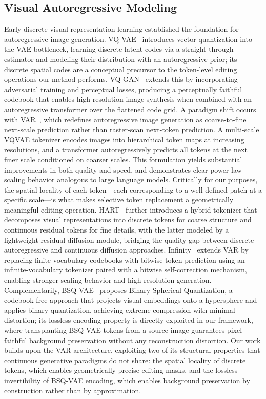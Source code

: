 \subsection{Visual Autoregressive Modeling}
Early discrete visual representation learning established the foundation for autoregressive image generation. VQ-VAE~\cite{VQVAE} introduces vector quantization into the VAE bottleneck, learning discrete latent codes via a straight-through estimator and modeling their distribution with an autoregressive prior; its discrete spatial codes are a conceptual precursor to the token-level editing operations our method performs. VQ-GAN~\cite{VQGAN} extends this by incorporating adversarial training and perceptual losses, producing a perceptually faithful codebook that enables high-resolution image synthesis when combined with an autoregressive transformer over the flattened code grid.
A paradigm shift occurs with VAR~\cite{VAR}, which redefines autoregressive image generation as coarse-to-fine next-scale prediction rather than raster-scan next-token prediction. A multi-scale VQVAE tokenizer encodes images into hierarchical token maps at increasing resolutions, and a transformer autoregressively predicts all tokens at the next finer scale conditioned on coarser scales. This formulation yields substantial improvements in both quality and speed, and demonstrates clear power-law scaling behavior analogous to large language models. Critically for our purposes, the spatial locality of each token---each corresponding to a well-defined patch at a specific scale---is what makes selective token replacement a geometrically meaningful editing operation. HART~\cite{HART} further introduces a hybrid tokenizer that decomposes visual representations into discrete tokens for coarse structure and continuous residual tokens for fine details, with the latter modeled by a lightweight residual diffusion module, bridging the quality gap between discrete autoregressive and continuous diffusion approaches. Infinity~\cite{Infinity} extends VAR by replacing finite-vocabulary codebooks with bitwise token prediction using an infinite-vocabulary tokenizer paired with a bitwise self-correction mechanism, enabling stronger scaling behavior and high-resolution generation. Complementarily, BSQ-VAE~\cite{BSQVAE} proposes Binary Spherical Quantization, a codebook-free approach that projects visual embeddings onto a hypersphere and applies binary quantization, achieving extreme compression with minimal distortion; its lossless encoding property is directly exploited in our framework, where transplanting BSQ-VAE tokens from a source image guarantees pixel-faithful background preservation without any reconstruction distortion.
Our work builds upon the VAR architecture, exploiting two of its structural properties that continuous generative paradigms do not share: the spatial locality of discrete tokens, which enables geometrically precise editing masks, and the lossless invertibility of BSQ-VAE encoding, which enables background preservation by construction rather than by approximation.